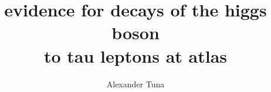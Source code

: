 \title{evidence for decays of the higgs boson\\ to tau leptons at atlas}
    
\author{Alexander Tuna}

\newcommand{\adviser}{H.H. Williams, Professor, Physics}
\newcommand{\advisershort}{H.H. Williams}
\newcommand{\myinstitution}{The University of Pennsylvania}
\newcommand{\chairperson}{Marija Drndic, Professor, Physics}

\newcommand{\committeeOne}{I. Joseph Kroll, Professor, Physics}
\newcommand{\committeeTwo}{Elliot Lipeles, Associate Professor, Physics}
\newcommand{\committeeThree}{Philip Nelson, Professor, Physics}
\newcommand{\committeeFour}{Burt Ovrut, Professor, Physics}




